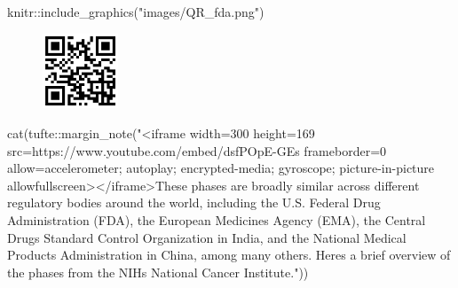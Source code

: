 \documentclass[
  letterpaper,
  DIV=11,
  numbers=noendperiod,
  oneside]{scrartcl}
\newenvironment{Shaded}{\begin{snugshade}}{\end{snugshade}}
\newcommand{\FunctionTok}[1]{\textcolor[rgb]{0.28,0.35,0.67}{#1}}
\newcommand{\NormalTok}[1]{\textcolor[rgb]{0.00,0.23,0.31}{#1}}
\newcommand{\SpecialCharTok}[1]{\textcolor[rgb]{0.37,0.37,0.37}{#1}}
\newcommand{\StringTok}[1]{\textcolor[rgb]{0.13,0.47,0.30}{#1}}
\begin{document}

\begin{Shaded}
\begin{Highlighting}[]
\NormalTok{knitr}\SpecialCharTok{::}\FunctionTok{include\_graphics}\NormalTok{(}\StringTok{"images/QR\_fda.png"}\NormalTok{)}
\end{Highlighting}
\end{Shaded}

\begin{figure}[H]

{\centering \includegraphics[width=0.2\textwidth,height=\textheight]{images/QR_fda.png}

}

\end{figure}

\begin{Shaded}
\begin{Highlighting}[]
\FunctionTok{cat}\NormalTok{(tufte}\SpecialCharTok{::}\FunctionTok{margin\_note}\NormalTok{(}\StringTok{"\textless{}iframe width=\textquotesingle{}300\textquotesingle{} height=\textquotesingle{}169\textquotesingle{} src=\textquotesingle{}https://www.youtube.com/embed/dsfPOpE{-}GEs\textquotesingle{} frameborder=\textquotesingle{}0\textquotesingle{} allow=\textquotesingle{}accelerometer; autoplay; encrypted{-}media; gyroscope; picture{-}in{-}picture\textquotesingle{} allowfullscreen\textgreater{}\textless{}/iframe\textgreater{}These phases are broadly similar across different regulatory bodies around the world, including the U.S. Federal Drug Administration (FDA), the European Medicines Agency (EMA), the Central Drugs Standard Control Organization in India, and the National Medical Products Administration in China, among many others. Here\textquotesingle{}s a brief overview of the phases from the NIH\textquotesingle{}s National Cancer Institute."}\NormalTok{))}
\end{Highlighting}
\end{Shaded}
\end{document}
